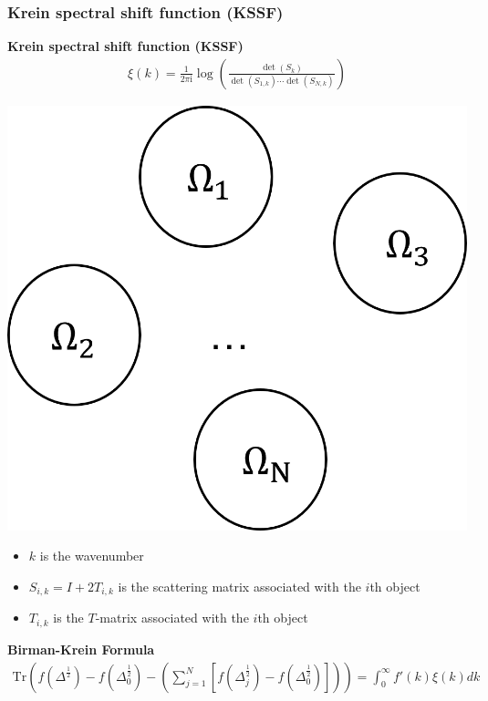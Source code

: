 \documentclass[dvipsnames,10pt]{beamer}
\begin{document}
\begin{frame}
    \frametitle{Krein spectral shift function (KSSF)}
    \vspace{0.3cm}
    \begin{minipage}{5cm}
    \textbf{Krein spectral shift function (KSSF)}
    \begin{align*}
    \xi(k) = \frac{1}{2\pi \mathrm{i}}\log\left(\frac{\det(S_{k})}{\det(S_{1,k})\cdots\det(S_{N,k})}\right)
\end{align*}
    
    \end{minipage}
    \begin{minipage}{2cm}
        \includegraphics[scale = 0.5]{figs/Domain.png}
    \end{minipage}

\begin{itemize}
    \item $k$ is the wavenumber
    \vspace{0.1cm}
    \item $S_{i,k} = I + 2T_{i,k}$ is the scattering matrix associated with the $i$th object
        \vspace{0.1cm}
    \item $T_{i,k}$ is the $T$-matrix associated with the $i$th object
\end{itemize}
\begin{tcolorbox}
\textbf{Birman-Krein Formula}
    \begin{align*}
    \text{Tr}\left(f(\Delta^{\frac{1}{2}}) - f(\Delta_{0}^{\frac{1}{2}}) - \left(\sum_{j = 1}^{N}[f(\Delta_{j}^{\frac{1}{2}}) - f(\Delta_{0}^{\frac{1}{2}})]\right)\right)  = \int_{0}^{\infty}f'(k)\xi(k)dk
\end{align*}
\end{tcolorbox}

\end{frame}
\end{document}
